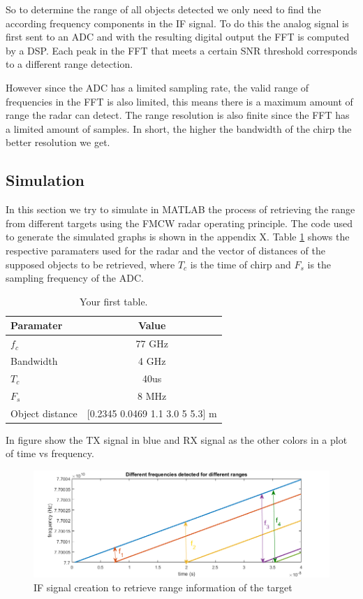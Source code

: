  So to determine the range of all objects detected we only need to find the according frequency components in the \ac{IF} signal. To do this the analog signal is first sent to an \ac{ADC} and with the resulting digital output the \ac{FFT} is computed by a \ac{DSP}. Each peak in the \ac{FFT} that meets a certain \ac{SNR} threshold corresponds to a different range detection. 
 
 However since the \ac{ADC} has a limited sampling rate, the valid range of frequencies in the \ac{FFT} is also limited, this means there is a maximum amount of range the radar can detect.
The range resolution is also finite since the \ac{FFT} has a limited amount of samples. In short, the higher the bandwidth of the chirp the better resolution we get.
\subsection*{Simulation}
In this section we try to simulate in MATLAB the process of retrieving the range from different targets using the \ac{FMCW} \ac{radar} operating principle. The code used to generate the simulated graphs is shown in the appendix X. Table \ref{tab:table1} shows the respective paramaters used for the radar and the vector of distances of the supposed objects to be retrieved, where $T_c$ is the time of chirp and $F_s$ is the sampling frequency of the \ac{ADC}.
\begin{table}[h!]
  \begin{center}
    \caption{Your first table.}
    \label{tab:table1}
    \begin{tabular}{l|c} %
      \textbf{Paramater} & \textbf{Value } \\
      \hline
      $f_c$ & 77 GHz \\
      Bandwidth & 4 GHz \\
      $T_c$ & 40us \\
      $F_s$ & 8 MHz \\
      Object distance & [0.2345 0.0469 1.1 3.0 5 5.3]  m
    \end{tabular}
  \end{center}
\end{table}
 In figure show the TX signal in blue and RX signal as the other colors in a plot of time vs frequency.
 \begin{figure}[h] 
\centerline{\includegraphics [width=1.0 \textwidth]{imgs/chapter2/SimFrequencies.png}}
\caption{IF signal creation to retrieve range information of the target}
\label{fig:if2}
\end{figure}

